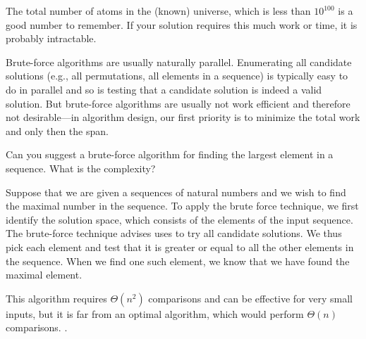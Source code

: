 %
\begin{remark}
The total number of atoms in the (known) universe, which is less than
$10^{100}$ is a good number to remember.
%
If your solution requires this much work or time, it is probably
intractable.
\end{remark}
%

\begin{important}
Brute-force algorithms are usually naturally parallel.
%
Enumerating all candidate solutions (e.g., all permutations, all
elements in a sequence) is typically easy to do in parallel and so is
testing that a candidate solution is indeed a valid solution.
%
But
brute-force algorithms are usually not work efficient and therefore not desirable---in algorithm design, our first priority
is to minimize the total work and only then the span.
\end{important}

\begin{teachask}
  Can you suggest a brute-force algorithm for finding the largest
  element in a sequence.  What is the complexity?
\end{teachask}
%
\begin{example}
Suppose that we are given a sequences of natural numbers and we wish
to find the maximal number in the sequence.
%
To apply the brute force technique, we first identify the solution
space, which consists of the elements of the input sequence.
%
The brute-force technique advises uses to try all candidate solutions.
%
We thus pick each element and test that it is greater or equal to all
the other elements in the sequence.  When we find one such element, we
know that we have found the maximal element.
%

This algorithm requires $\Theta(n^2)$ comparisons and can be effective
for very small inputs, but it is far from an optimal algorithm, which
would perform $\Theta(n)$ comparisons.  .
\end{example}

%



